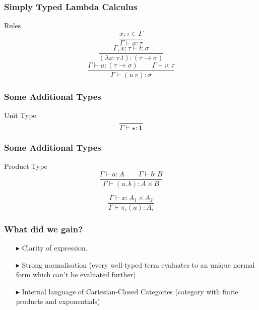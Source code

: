 \documentclass[14pt,compress]{beamer}
\begin{document}
\begin{frame}\label{frame : rules of simply typed lambda calculus}
\frametitle{Simply Typed Lambda Calculus}

\begin{block}{Rules}
\pause
\[ \frac{x{:}\tau \in \Gamma}{\Gamma \vdash x{:}\tau} \]
\pause
\[ \frac{\Gamma, x{:}\tau \vdash {t}:\sigma}{(\lambda x{:}\tau.t) : (\tau \to \sigma)} \]
\pause
\[ \frac{\Gamma \vdash u{:}(\tau \to \sigma) \qquad \Gamma \vdash v{:}\tau}
        {\Gamma \vdash (u\ v){:}\sigma} \]
\end{block}
\end{frame}

\begin{frame}\label{frame : unit type}
\frametitle{Some Additional Types}

\begin{block}{Unit Type}
\[ \frac{}{\Gamma \vdash \star {:} \mathbf{1}} \]
\end{block}
\end{frame}

\begin{frame}\label{frame : product type}
\frametitle{Some Additional Types}

\begin{block}{Product Type}
\[ \frac{\Gamma \vdash a {:} A \qquad \Gamma \vdash b {:} B}
        {\Gamma \vdash (a{,}b){:}A{\times} B} \]
        
\[ \frac{\Gamma \vdash x{:}A_1{\times} A_2}{\Gamma \vdash \pi_i(a){:}A_i} \]        
\end{block}
\end{frame}

\begin{frame}\label{frame : what did we gain}
\frametitle{What did we gain?}
\begin{enumerate}
\pause
\item[$\blacktriangleright$] \textcolor{beamer@mathtext}{Clarity of expression}.
\pause
\item[$\blacktriangleright$] \textcolor{beamer@mathtext}{Strong normalisation}
  (every well-typed term evaluates to an unique normal form which can't be evaluated further)
\pause
\item[$\blacktriangleright$] \textcolor{beamer@mathtext}{Internal language of Cartesian-Closed Categories}
(category with finite products and exponentials)   
\end{enumerate}
\end{frame}
\end{document}
